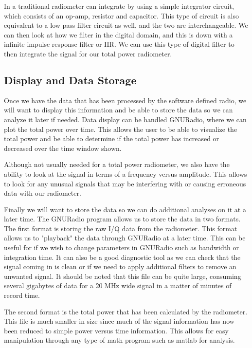 In a traditional radiometer can integrate by using a simple integrator circuit, which consists of an op-amp, resistor and capacitor.  This type of circuit is also equivalent to a low pass filter circuit as well, and the two are interchangeable.  We can then look at how we filter in the digital domain, and this is down with a infinite impulse response filter or IIR.  We can use this type of digital filter to then integrate the signal for our total power radiometer. 

\subsection{Display and Data Storage}
Once we have the data that has been processed by the software defined radio, we will want to display this information and be able to store the data so we can analyze it later if needed.  Data display can be handled GNURadio, where we can plot the total power over time.  This allows the user to be able to visualize the total power and be able to determine if the total power has increased or decreased over the time window shown.  

Although not usually needed for a total power radiometer, we also have the ability to look at the signal in terms of a frequency versus amplitude.  This allows to look for any unusual signals that may be interfering with or causing erroneous data with our radiometer.  

Finally we will want to store the data so we can do additional analyses on it at a later time.  The GNURadio program allows us to store the data in two formats.  The first format is storing the raw I/Q data from the radiometer.  This format allows us to "playback" the data through GNURadio at a later time.  This can be useful for if we wish to change parameters in GNURadio such as bandwidth or integration time.  It can also be a good diagnostic tool as we can check that the signal coming in is clean or if we need to apply additional filters to remove an unwanted signal. It should be noted that this file can be quite large, consuming several gigabytes of data for a 20 MHz wide signal in a matter of minutes of record time.

The second format is the total power that has been calculated by the radiometer.  This file is much smaller in size since much of the signal information has now been reduced to simple power versus time information.  This allows for easy manipulation through any type of math program such as matlab for analysis.  